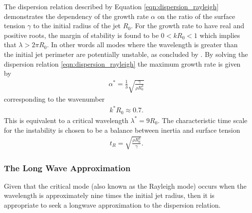 \documentclass[11pt]{article}
\begin{document}
The dispersion relation described by Equation \ref{eqn:dispersion_rayleigh} demonstrates the dependency of the growth rate $\alpha$ on the ratio of the surface tension $\gamma$ to the initial radius of the jet $R_0$. For the growth rate to have real and positive roots, the margin of stability is found to be $0 < kR_0 <1$ which implies that $\lambda > 2 \pi R_0$. In other words all modes where the wavelength is greater than the initial jet perimeter are potentially unstable, as concluded by \cite{plateau1873statique}. By solving the dispersion relation \ref{eqn:dispersion_rayleigh} the maximum growth rate is given by 
\begin{align*}
\alpha^* = \frac{1}{3} \sqrt{\frac{\gamma}{\rho R_0^3}}
\end{align*}
corresponding to the wavenumber
\begin{align*}
k^*R_0 \approx 0.7.
\end{align*}
This is equivalent to a critical wavelength $\lambda^* = 9 R_0$. The characteristic time scale for the instability is chosen to be a balance between inertia and surface tension
\begin{align*}
t_R = \sqrt{\frac{\rho R_0^3}{\gamma}}.
\end{align*}

\subsubsection{The Long Wave Approximation}
Given that the critical mode (also known as the Rayleigh mode) occurs when the wavelength is approximately nine times the initial jet radius, then it is appropriate to seek a longwave approximation to the dispersion relation.
\end{document}
